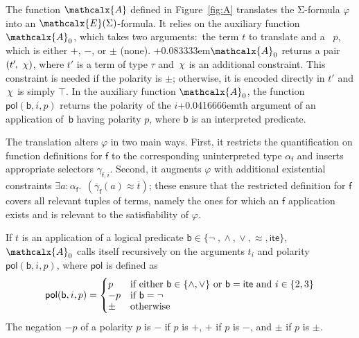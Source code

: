 \documentclass[runningheads,a4paper]{llncs}
\newcommand\pnegate{-}
\newcommand{\con}[1]{\mathsf{#1}}
\renewcommand\vec[1]{\overline{#1}}
\let\oldchi=\chi
\def\chi{{\vthinspace\oldchi}}
\let\oldSigma=\Sigma
\def\Sigma{\mathrm{\oldSigma}}
\let\oldneg=\neg
\def\neg{\oldneg\;}
\let\oldvee=\vee
\def\vee{\mathrel{\oldvee}}
\let\oldwedge=\wedge
\def\wedge{\mathrel{\oldwedge}}
\newcommand{\teq}{\approx}
\newcommand{\conv}{\mathcalx{A}}
\newcommand{\pnone}{{\pm}}
\newcommand{\ppos}{{+}}
\newcommand{\pneg}{{-}}
\newcommand{\pol}{\con{pol}}
\newcommand{\ltrue}{\top}
\newcommand{\lite}{\con{ite}}
\newcommand\concret{\gamma} %
\newcommand{\boolop}{\con{b}}
\newcommand{\vecfarg}[1]{\vec{\concret}_{#1}}
\newcommand{\fargx}[2]{\concret_{#1,#2}}
\newcommand{\fargtype}[1]{\alpha_{#1}}
\newcommand{\extendsig}[1]{\mathcalx{E}( #1 )}
\newcommand{\rem}[1]{\textcolor{red}{[#1]}}
\newcommand{\jb}[1]{\rem{#1 --jb}}
\newcommand{\negvthinspace}{\kern-0.083333em}
\newcommand{\vthinspace}{\kern+0.083333em}
\newcommand{\vvthinspace}{\kern+0.0416666em}
\begin{document}
The function $\conv$ defined in Figure~\ref{fig:A} translates the $\Sigma$-formula
$\varphi$ into an $\extendsig{\Sigma}$-formula. It relies
on the auxiliary function $\conv_0$, which takes two arguments:\ the term $t$
to translate and a ~$p$, which is either $\ppos$, $\pneg$, or
$\pnone$ (none). \vthinspace$\conv_0$ returns a pair $( t'\negvthinspace,\, \chi )$, where $t'$ is a term of
type $\tau$ and $\chi$ is an additional constraint.
This constraint is needed if the polarity is $\pnone$; otherwise, it is encoded
directly in $t'$ and $\chi$ is simply $\ltrue$.
In the auxiliary function $\conv_0$, the function $\pol(
\boolop, i, p )$ returns the polarity of the $i$\vvthinspace{th} argument of an
application of~$\boolop$ having polarity $p$, where $\boolop$ is an interpreted
predicate.



The translation alters $\varphi$ in two main ways. First, it restricts the
quantification on function definitions for $\con{f}$ to the corresponding
uninterpreted type $\fargtype{\con{f}}$ and inserts appropriate selectors
$\fargx{\con{f}}{i}$. Second, it augments $\varphi$ with additional existential
constraints
$\exists a : \fargtype{\con{f}}.\;\, (\vecfarg{\con{f}}( a ) \teq \vec t)$; these
ensure that the restricted definition for $\con{f}$ covers all relevant tuples
of terms, namely the ones for which an $\con{f}$ application exists and is
relevant to the satisfiability of $\varphi$.

If $t$ is an application of a logical predicate $\boolop
\in \{{\neg}, {\wedge}, {\vee}, {\teq}, {\lite}\}$,
$\conv_0$ calls itself recursively on the arguments $t_i$ and polarity $\pol(
\boolop, i, p )$, where $\pol$ is defined as
\begin{equation*}
\pol( \boolop, i, p ) =
\begin{cases}
p & \text{if either $\boolop \in \{{\wedge}, {\vee}\}$ or $\boolop = \lite$ and $i \in \{2, 3\}$} \\[-\jot]
\pnegate p & \text{if $\boolop = {\neg}$} \\[-\jot]
\pnone & \text{otherwise}
\end{cases}
\end{equation*}
The negation $\pnegate p$ of a polarity $p$ is $\pneg$ if $p$ is $\ppos$, $\ppos$
if $p$ is $\pneg$, and $\pnone$ if $p$ is $\pnone$.
\end{document}

